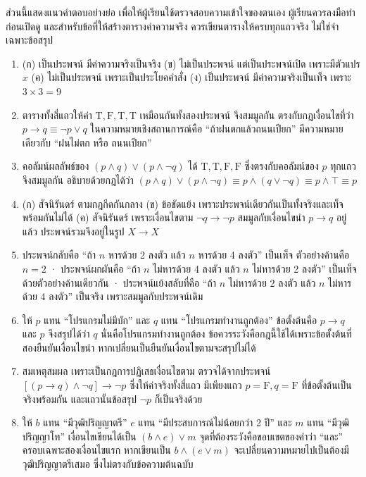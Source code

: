 ส่วนนี้แสดงแนวคำตอบอย่างย่อ เพื่อให้ผู้เรียนใช้ตรวจสอบความเข้าใจของตนเอง ผู้เรียนควรลงมือทำก่อนเปิดดู และสำหรับข้อที่ให้สร้างตารางค่าความจริง ควรเขียนตารางให้ครบทุกแถวจริง ไม่ใช่จำเฉพาะข้อสรุป

\begin{enumerate}
    \item (ก) เป็นประพจน์ มีค่าความจริงเป็นจริง (ข) ไม่เป็นประพจน์ แต่เป็นประพจน์เปิด เพราะมีตัวแปร $x$ (ค) ไม่เป็นประพจน์ เพราะเป็นประโยคคำสั่ง (ง) เป็นประพจน์ มีค่าความจริงเป็นเท็จ เพราะ $3 \times 3 = 9$

    \item ตารางทั้งสี่แถวให้ค่า $\text{T}, \text{F}, \text{T}, \text{T}$ เหมือนกันทั้งสองประพจน์ จึงสมมูลกัน ตรงกับกฎเงื่อนไขที่ว่า $p \rightarrow q \equiv \neg p \lor q$ ในความหมายเชิงสถานการณ์คือ ``ถ้าฝนตกแล้วถนนเปียก'' มีความหมายเดียวกับ ``ฝนไม่ตก หรือ ถนนเปียก''

    \item คอลัมน์ผลลัพธ์ของ $(p \land q) \lor (p \land \neg q)$ ได้ $\text{T}, \text{T}, \text{F}, \text{F}$ ซึ่งตรงกับคอลัมน์ของ $p$ ทุกแถว จึงสมมูลกัน อธิบายด้วยกฎได้ว่า $(p \land q) \lor (p \land \neg q) \equiv p \land (q \lor \neg q) \equiv p \land \top \equiv p$

    \item (ก) สัจนิรันดร์ ตามกฎกีดกันกลาง (ข) ข้อขัดแย้ง เพราะประพจน์เดียวกันเป็นทั้งจริงและเท็จพร้อมกันไม่ได้ (ค) สัจนิรันดร์ เพราะเงื่อนไขตาม $\neg q \rightarrow \neg p$ สมมูลกับเงื่อนไขนำ $p \rightarrow q$ อยู่แล้ว ประพจน์รวมจึงอยู่ในรูป $X \rightarrow X$

    \item ประพจน์กลับคือ ``ถ้า $n$ หารด้วย 2 ลงตัว แล้ว $n$ หารด้วย 4 ลงตัว'' เป็นเท็จ ตัวอย่างค้านคือ $n = 2$ · ประพจน์ผกผันคือ ``ถ้า $n$ ไม่หารด้วย 4 ลงตัว แล้ว $n$ ไม่หารด้วย 2 ลงตัว'' เป็นเท็จด้วยตัวอย่างค้านเดียวกัน · ประพจน์แย้งสลับที่คือ ``ถ้า $n$ ไม่หารด้วย 2 ลงตัว แล้ว $n$ ไม่หารด้วย 4 ลงตัว'' เป็นจริง เพราะสมมูลกับประพจน์เดิม

    \item ให้ $p$ แทน ``โปรแกรมไม่มีบัก'' และ $q$ แทน ``โปรแกรมทำงานถูกต้อง'' ข้อตั้งต้นคือ $p \rightarrow q$ และ $p$ จึงสรุปได้ว่า $q$ นั่นคือโปรแกรมทำงานถูกต้อง ข้อควรระวังคือกฎนี้ใช้ได้เพราะข้อตั้งต้นที่สองยืนยันเงื่อนไขนำ หากเปลี่ยนเป็นยืนยันเงื่อนไขตามจะสรุปไม่ได้

    \item สมเหตุสมผล เพราะเป็นกฎการปฏิเสธเงื่อนไขตาม ตรวจได้จากประพจน์ $[(p \rightarrow q) \land \neg q] \rightarrow \neg p$ ซึ่งให้ค่าจริงทั้งสี่แถว มีเพียงแถว $p=\text{F}, q=\text{F}$ ที่ข้อตั้งต้นเป็นจริงพร้อมกัน และแถวนั้นข้อสรุป $\neg p$ ก็เป็นจริงด้วย

    \item ให้ $b$ แทน ``มีวุฒิปริญญาตรี'' $e$ แทน ``มีประสบการณ์ไม่น้อยกว่า 2 ปี'' และ $m$ แทน ``มีวุฒิปริญญาโท'' เงื่อนไขเขียนได้เป็น $(b \land e) \lor m$ จุดที่ต้องระวังคือขอบเขตของคำว่า ``และ'' ครอบเฉพาะสองเงื่อนไขแรก หากเขียนเป็น $b \land (e \lor m)$ จะเปลี่ยนความหมายไปเป็นต้องมีวุฒิปริญญาตรีเสมอ ซึ่งไม่ตรงกับข้อความต้นฉบับ
\end{enumerate}

